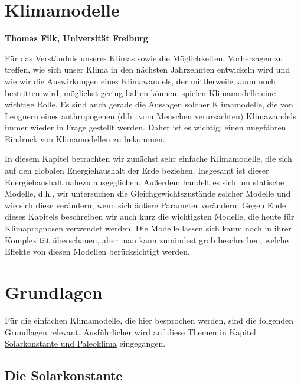 
\setcounter{page}{1}
\setcounter{section}{0}
\setcounter{figure}{0}
\setcounter{equation}{0}
\setcounter{table}{0}
\setcounter{footnote}{0}

\section*{Klimamodelle}
\vspace{0.2cm}
\noindent
{\bf Thomas Filk, Universit\"at Freiburg}
\vspace{1cm}

\label{chap_Klima3}
\noindent
F\"ur das Verst\"andnis unseres Klimas sowie die M\"oglichkeiten, Vorhersagen zu treffen, wie sich
unser Klima in den n\"achsten Jahrzehnten entwickeln wird und wie wir die Auswirkungen eines
Klimawandels, der mittlerweile kaum noch bestritten wird, m\"oglichst gering halten k\"onnen,
spielen Klimamodelle eine wichtige Rolle. Es sind auch gerade die Aussagen solcher Klimamodelle,
die von Leugnern eines anthropogenen (d.h.\ vom Menschen verursachten) Klimawandels immer
wieder in Frage gestellt werden. Daher ist es wichtig, einen ungef\"ahren Eindruck von Klimamodellen
zu bekommen. 

In diesem Kapitel betrachten wir zun\"achst sehr einfache Klimamodelle, die sich auf den globalen 
Energiehaushalt der Erde beziehen. Insgesamt ist dieser Energiehaushalt
nahezu ausgeglichen. Au\ss erdem handelt es sich um statische Modelle, d.h., wir untersuchen  
die Gleichgewichtszust\"ande solcher Modelle und wie sich diese ver\"andern, wenn sich \"au\ss ere
Parameter ver\"andern. Gegen Ende dieses Kapitels beschreiben wir auch kurz die wichtigsten
Modelle, die heute f\"ur Klimaprognosen verwendet werden. Die Modelle lassen sich kaum noch
in ihrer Komplexit\"at \"uberschauen, aber man kann zumindest grob beschreiben, welche Effekte
von diesen Modellen ber\"ucksichtigt werden. 

\section{Grundlagen}

F\"ur die einfachen Klimamodelle, die hier besprochen werden, sind die folgenden Grundlagen
relevant. Ausf\"uhrlicher wird auf diese Themen in Kapitel \hyperref[chap_Klima1]{Solarkonstante und Paleoklima} 
eingegangen. 

\subsection{Die Solarkonstante}

